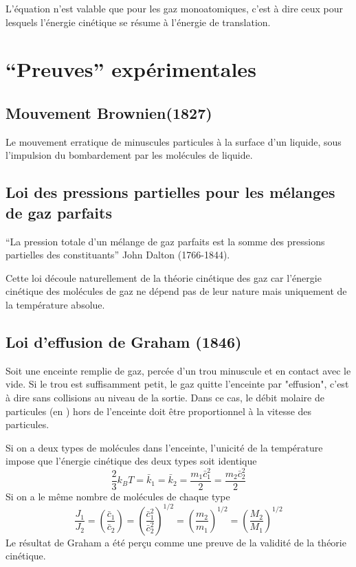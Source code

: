 L'équation n'est valable que pour les gaz monoatomiques,
c'est à dire ceux pour lesquels l'énergie cinétique se résume à
l'énergie de translation.

\section{``Preuves'' expérimentales}
\subsection{Mouvement Brownien(1827)}
Le mouvement erratique de minuscules particules à la surface d'un liquide,
sous l'impulsion du bombardement par les molécules de liquide.

\subsection{Loi des pressions partielles pour les mélanges de gaz parfaits}
``La pression totale d'un mélange de gaz parfaits est
la somme des pressions partielles des constituants'' John Dalton (1766-1844).

Cette loi découle naturellement de la théorie cinétique des gaz car
l'énergie cinétique des molécules de gaz ne dépend pas de leur nature mais
uniquement de la température absolue.

\subsection{Loi d'effusion de Graham (1846)}
Soit une enceinte remplie de gaz, percée d'un trou minuscule et
en contact avec le vide.
Si le trou est suffisamment petit, le gaz quitte l'enceinte par "effusion",
c'est à dire sans collisions au niveau de la sortie.
Dans ce cas, le débit molaire de particules (\joule en \mole\per\second)
hors de l'enceinte doit être proportionnel à la vitesse des particules.

Si on a deux types de molécules dans l'enceinte,
l'unicité de la température impose que
l'énergie cinétique des deux types soit identique
\[ \frac 23 k_BT = \bar k_1 = \bar k_2 = \frac{m_1\bar c_1^2}{2} =
\frac{m_2\bar c_2^2}{2} \]
Si on a le même nombre de molécules de chaque type
\[ \frac{J_1}{J_2} = \left(\frac{\bar c_1}{\bar c_2}\right) =
\left(\frac{\bar c_1^2}{\bar c_2^2}\right)^{1/2} =
\left(\frac{m_2}{m_1}\right)^{1/2} =
\left(\frac{M_2}{M_1}\right)^{1/2} \]
Le résultat de Graham a été perçu comme
une preuve de la validité de la théorie cinétique.

